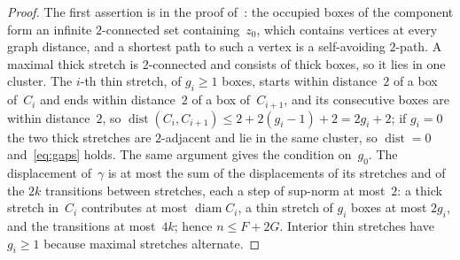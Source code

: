 \documentclass[11pt,letterpaper]{article}
\begin{document}
\begin{proof}
The first assertion is in the proof of~\cite[Theorem~5.1]{HJ26b}: the occupied boxes of the component form an infinite $2$-connected set containing~$z_0$, which contains vertices at every graph distance, and a shortest path to such a vertex is a self-avoiding $2$-path. A maximal thick stretch is $2$-connected and consists of thick boxes, so it lies in one cluster. The $i$-th thin stretch, of $g_i\ge1$ boxes, starts within distance~$2$ of a box of~$C_i$ and ends within distance~$2$ of a box of~$C_{i+1}$, and its consecutive boxes are within distance~$2$, so $\operatorname{dist}(C_i,C_{i+1})\le2+2(g_i-1)+2=2g_i+2$; if $g_i=0$ the two thick stretches are $2$-adjacent and lie in the same cluster, so $\operatorname{dist}=0$ and~\eqref{eq:gaps} holds. The same argument gives the condition on~$g_0$. The displacement of~$\gamma$ is at most the sum of the displacements of its stretches and of the $2k$ transitions between stretches, each a step of sup-norm at most~$2$: a thick stretch in~$C_i$ contributes at most $\operatorname{diam}C_i$, a thin stretch of $g_i$ boxes at most $2g_i$, and the transitions at most~$4k$; hence $n\le F+2G$. Interior thin stretches have $g_i\ge1$ because maximal stretches alternate.
\end{proof}
\end{document}
